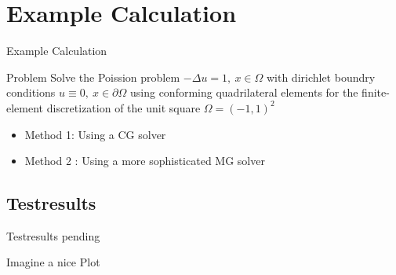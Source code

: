 \documentclass[10pt]{beamer}
\begin{document}
\section{Example Calculation}
\begin{frame}{Example Calculation}
\begin{block}{Problem}
Solve the Poission problem $- \Delta u = 1,~x\in\Omega$ with dirichlet boundry conditions $u \equiv 0,~x\in \partial \Omega$ using conforming quadrilateral 
elements for the finite-element discretization of the unit square $\Omega = 
(-1,1)^2$
\end{block}

\begin{itemize}
\item Method 1: Using a CG solver
\item Method 2 : Using a more sophisticated MG solver
\end{itemize}

\end{frame}

\subsection{Testresults}
\begin{frame}{Testresults pending}
\begin{center}
\color{red} Imagine a nice Plot\color{black}
\end{center}
\end{frame}
\end{document}
